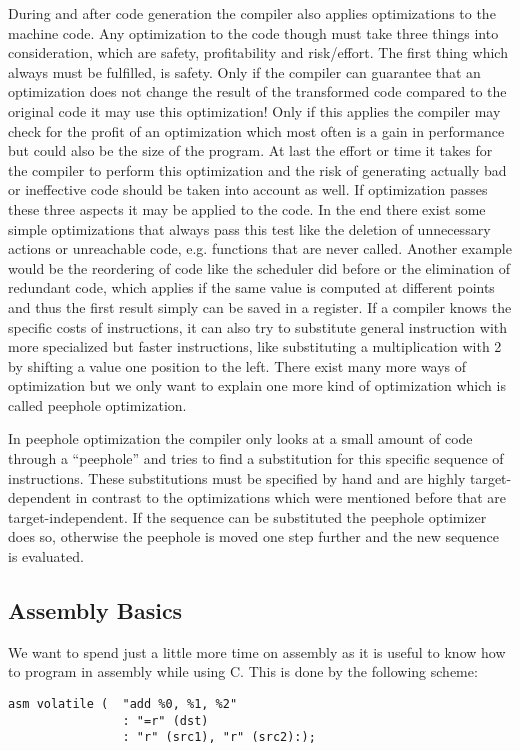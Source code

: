 During and after code generation the compiler also applies optimizations to the machine code.
Any optimization to the code though must take three things into consideration, which are safety, profitability and risk/effort.
The first thing which always must be fulfilled, is safety.
Only if the compiler can guarantee that an optimization does not change the result of the transformed code compared to the original code it may use this optimization!
Only if this applies the compiler may check for the profit of an optimization which most often is a gain in performance but could also be the size of the program.
At last the effort or time it takes for the compiler to perform this optimization and the risk of generating actually bad or ineffective code should be taken into account as well.
If optimization passes these three aspects it may be applied to the code.
In the end there exist some simple optimizations that always pass this test like the deletion of unnecessary actions or unreachable code, e.g. functions that are never called.
Another example would be the reordering of code like the scheduler did before or the elimination of redundant code, which applies if the same value is computed at different points and thus the first result simply can be saved in a register.
If a compiler knows the specific costs of instructions, it can also try to substitute general instruction with more specialized but faster instructions, like substituting a multiplication with 2 by shifting a value one position to the left.
There exist many more ways of optimization but we only want to explain one more kind of optimization which is called peephole optimization.

In peephole optimization the compiler only looks at a small amount of code through a ``peephole'' and tries to find a substitution for this specific sequence of instructions.
These substitutions must be specified by hand and are highly target-dependent in contrast to the optimizations which were mentioned before that are target-independent.
If the sequence can be substituted the peephole optimizer does so, otherwise the peephole is moved one step further and the new sequence is evaluated.

\subsection{Assembly Basics}
\label{section:asm}


We want to spend just a little more time on assembly as it is useful to know how to program in assembly while using C.
This is done by the following scheme:
\begin{lstlisting}
asm volatile (  "add %0, %1, %2"
                : "=r" (dst)
                : "r" (src1), "r" (src2):);
\end{lstlisting}

